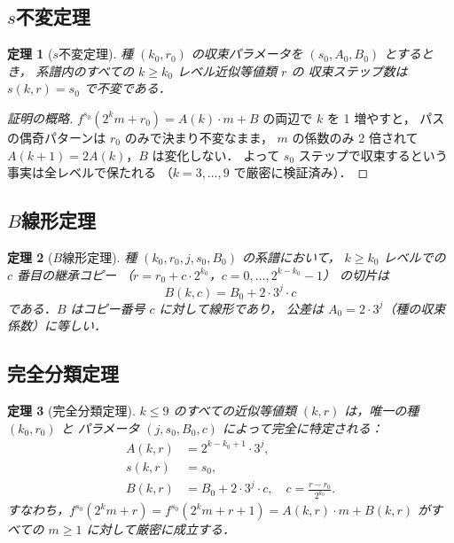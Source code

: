 \documentclass[twocolumn,a4paper,10pt]{jsarticle}
\newtheorem{theorem}{定理}[section]
\begin{document}
\subsection{$s$不変定理}

\begin{theorem}[$s$不変定理]\label{thm:sinvariant}
種 $(k_0, r_0)$ の収束パラメータを $(s_0, A_0, B_0)$ とするとき，
系譜内のすべての $k \geq k_0$ レベル近似等値類 $r$ の
収束ステップ数は $s(k, r) = s_0$ で不変である．
\end{theorem}

\begin{proof}[証明の概略]
$f^{s_0}(2^k m + r_0) = A(k)\cdot m + B$ の両辺で $k$ を 1 増やすと，
パスの偶奇パターンは $r_0$ のみで決まり不変なまま，
$m$ の係数のみ 2 倍されて $A(k+1)=2A(k)$，$B$ は変化しない．
よって $s_0$ ステップで収束するという事実は全レベルで保たれる
（$k=3,\ldots,9$ で厳密に検証済み）．
\end{proof}

\subsection{$B$線形定理}

\begin{theorem}[$B$線形定理]\label{thm:blinear}
種 $(k_0, r_0, j, s_0, B_0)$ の系譜において，
$k \geq k_0$ レベルでの $c$ 番目の継承コピー
（$r = r_0 + c \cdot 2^{k_0}$，$c = 0,\ldots,2^{k-k_0}-1$）
の切片は
\[
  B(k, c) = B_0 + 2 \cdot 3^j \cdot c
\]
である．$B$ はコピー番号 $c$ に対して線形であり，
公差は $A_0 = 2\cdot 3^j$（種の収束係数）に等しい．
\end{theorem}

\subsection{完全分類定理}

\begin{theorem}[完全分類定理]\label{thm:classification}
$k \leq 9$ のすべての近似等値類 $(k, r)$ は，唯一の種 $(k_0, r_0)$ と
パラメータ $(j, s_0, B_0, c)$ によって完全に特定される：
\begin{align}
  A(k, r) &= 2^{k - k_0 + 1} \cdot 3^j, \label{eq:A}\\
  s(k, r) &= s_0, \label{eq:s}\\
  B(k, r) &= B_0 + 2 \cdot 3^j \cdot c, \quad
             c = \frac{r - r_0}{2^{k_0}}. \label{eq:B}
\end{align}
すなわち，$f^{s_0}(2^k m + r) = f^{s_0}(2^k m + r + 1) = A(k,r)\cdot m + B(k,r)$
がすべての $m \geq 1$ に対して厳密に成立する．
\end{theorem}
\end{document}
